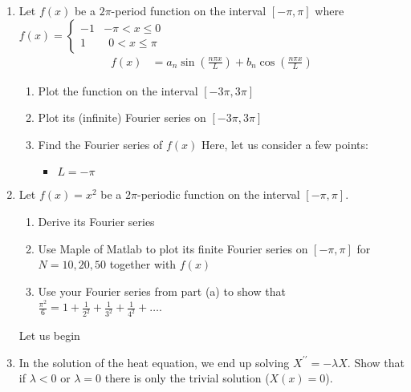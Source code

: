 \documentclass{article}
\begin{document}
\begin{enumerate}
  \item Let $f(x)$ be a $2 \pi$-period function on the interval $[-\pi, \pi]$ where
  $\displaystyle
  f(x) =
  \begin{cases}
    -1 & - \pi < x \leq 0\\
    1 &\ \ 0 < x \leq \pi
  \end{cases}
  $
  \begin{align}
    f(x) & = a_n \sin\left( \frac{n \pi x}{L} \right) + b_n \cos\left( \frac{n \pi x}{L} \right)
  \end{align}
  \begin{enumerate}
%
    \item Plot the function on the interval $[-3\pi, 3\pi]$
    \item Plot its (infinite) Fourier series on $[-3 \pi, 3 \pi]$
    \item Find the Fourier series of $f(x)$
    Here, let us consider a few points:
    \begin{itemize}
      \item $L = -\pi$
    \end{itemize}

%
\newpage
\end{enumerate}
  \item Let $f(x) = x^2$ be a $2 \pi$-periodic function on the interval $[-\pi, \pi]$.
  \begin{enumerate}
    \item Derive its Fourier series
    \item Use Maple of Matlab to plot its finite Fourier series on $[-\pi, \pi]$ for $N = 10, 20, 50$ together with $f(x)$
    \item Use your Fourier series from part (a) to show that $\frac{\pi^2}{6} = 1 + \frac{1}{2^2} + \frac{1}{3^2} + \frac{1}{4^2} + \ldots$.
  \end{enumerate}
%
Let us begin
%
  \item In the solution of the heat equation, we end up solving $X^{\prime\prime} = -\lambda X$. Show that if $\lambda < 0$ or $\lambda = 0$ there is only the trivial solution ($X(x) = 0$).


\end{enumerate}
\end{document}
